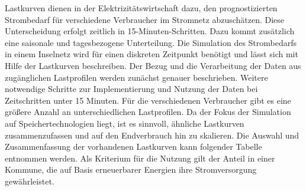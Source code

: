 Lastkurven dienen in der Elektrizitätswirtschaft dazu, den prognostizierten Strombedarf für verschiedene Verbraucher im Stromnetz abzuschätzen. 
Diese Unterscheidung erfolgt zeitlich in 15-Minuten-Schritten. 
Dazu kommt zusätzlich eine saisonale und tagesbezogene Unterteilung. 
Die Simulation des Strombedarfs in einem Inselnetz wird für einen diskreten Zeitpunkt benötigt und lässt sich mit Hilfe der Lastkurven beschreiben. 
Der Bezug und die Verarbeitung der Daten aus zugänglichen Lastprofilen werden zunächst genauer beschrieben. 
Weitere notwendige Schritte zur Implementierung und Nutzung der Daten bei Zeitschritten unter 15 Minuten.
Für die verschiedenen Verbraucher gibt es eine größere Anzahl an unterschiedlichen Lastprofilen. 
Da der Fokus der Simulation auf Speichertechnologien liegt, ist es sinnvoll, ähnliche Lastkurven zusammenzufassen und auf den Endverbrauch hin zu skalieren. 
Die Auswahl und Zusammenfassung der vorhandenen Lastkurven kann folgender Tabelle entnommen werden. 
Als Kriterium für die Nutzung gilt der Anteil in einer Kommune, die auf Basis erneuerbarer Energien ihre Stromversorgung gewährleistet.

